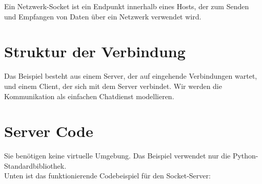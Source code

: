 \documentclass[
  nswissgerman,
  a4paper,
  DIV=11,
  numbers=noendperiod,
  ngerman]{scrreprt}
\begin{document}
\begin{tcolorbox}[enhanced jigsaw, arc=.35mm, bottomrule=.15mm, bottomtitle=1mm, breakable, colback=white, colbacktitle=quarto-callout-note-color!10!white, colframe=quarto-callout-note-color-frame, coltitle=black, left=2mm, leftrule=.75mm, opacityback=0, opacitybacktitle=0.6, rightrule=.15mm, title=\textcolor{quarto-callout-note-color}{\faInfo}\hspace{0.5em}{Network Socket}, titlerule=0mm, toprule=.15mm, toptitle=1mm]

Ein Netzwerk-Socket ist ein Endpunkt innerhalb eines Hosts, der zum
Senden und Empfangen von Daten über ein Netzwerk verwendet wird.

\end{tcolorbox}

\section{Struktur der Verbindung}\label{struktur-der-verbindung}

Das Beispiel besteht aus einem Server, der auf eingehende Verbindungen
wartet, und einem Client, der sich mit dem Server verbindet. Wir werden
die Kommunikation als einfachen Chatdienst modellieren.

\section{Server Code}\label{server-code}

Sie benötigen keine virtuelle Umgebung. Das Beispiel verwendet nur die
Python-Standardbibliothek.\\
Unten ist das funktionierende Codebeispiel für den Socket-Server:
\end{document}
